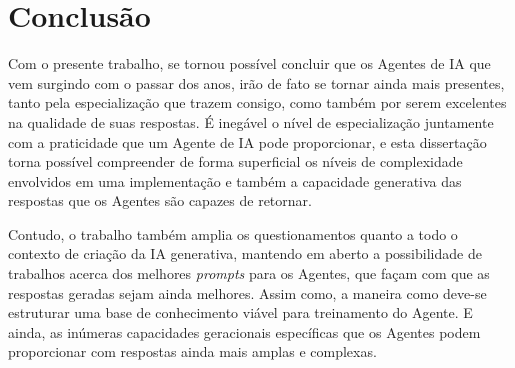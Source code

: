 \documentclass{article}
\begin{document}
\section{Conclusão}

\hspace{0.5cm}Com o presente trabalho, se tornou possível concluir que os Agentes de IA que vem surgindo com o passar dos anos, irão de fato se tornar ainda mais presentes, tanto pela especialização que trazem consigo, como também por serem excelentes na qualidade de suas respostas. É inegável o nível de especialização juntamente com a praticidade que um Agente de IA pode proporcionar, e esta dissertação torna possível compreender de forma superficial os níveis de complexidade envolvidos em uma implementação e também a capacidade generativa das respostas que os Agentes são capazes de retornar.

Contudo, o trabalho também amplia os questionamentos quanto a todo o contexto de criação da IA generativa, mantendo em aberto a possibilidade de trabalhos acerca dos melhores \textit{prompts} para os Agentes, que façam com que as respostas geradas sejam ainda melhores. Assim como, a maneira como deve-se estruturar uma base de conhecimento viável para treinamento do Agente. E ainda, as inúmeras capacidades geracionais específicas que os Agentes podem proporcionar com respostas ainda mais amplas e complexas.



\end{document}
